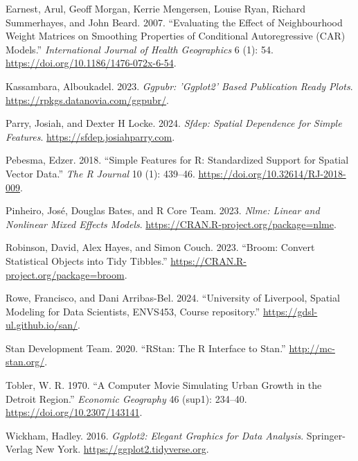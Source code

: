 \begin{CSLReferences}{1}{0}
\leavevmode{}%
Earnest, Arul, Geoff Morgan, Kerrie Mengersen, Louise Ryan, Richard Summerhayes, and John Beard. 2007. {``Evaluating the Effect of Neighbourhood Weight Matrices on Smoothing Properties of Conditional Autoregressive (CAR) Models.''} \emph{International Journal of Health Geographics} 6 (1): 54. \url{https://doi.org/10.1186/1476-072x-6-54}.

\leavevmode{}%
Kassambara, Alboukadel. 2023. \emph{Ggpubr: 'Ggplot2' Based Publication Ready Plots}. \url{https://rpkgs.datanovia.com/ggpubr/}.

\leavevmode{}%
Parry, Josiah, and Dexter H Locke. 2024. \emph{Sfdep: Spatial Dependence for Simple Features}. \url{https://sfdep.josiahparry.com}.

\leavevmode{}%
Pebesma, Edzer. 2018. {``{Simple Features for R: Standardized Support for Spatial Vector Data}.''} \emph{{The R Journal}} 10 (1): 439--46. \url{https://doi.org/10.32614/RJ-2018-009}.

\leavevmode{}%
Pinheiro, José, Douglas Bates, and R Core Team. 2023. \emph{Nlme: Linear and Nonlinear Mixed Effects Models}. \url{https://CRAN.R-project.org/package=nlme}.

\leavevmode{}%
Robinson, David, Alex Hayes, and Simon Couch. 2023. {``Broom: Convert Statistical Objects into Tidy Tibbles.''} \url{https://CRAN.R-project.org/package=broom}.

\leavevmode{}%
Rowe, Francisco, and Dani Arribas-Bel. 2024. {``{University of Liverpool, Spatial Modeling for Data Scientists, ENVS453, Course repository}.''} \url{https://gdsl-ul.github.io/san/}.

\leavevmode{}%
Stan Development Team. 2020. {``{RStan}: The {R} Interface to {Stan}.''} \url{http://mc-stan.org/}.

\leavevmode{}%
Tobler, W. R. 1970. {``A Computer Movie Simulating Urban Growth in the Detroit Region.''} \emph{Economic Geography} 46 (sup1): 234--40. \url{https://doi.org/10.2307/143141}.

\leavevmode{}%
Wickham, Hadley. 2016. \emph{Ggplot2: Elegant Graphics for Data Analysis}. Springer-Verlag New York. \url{https://ggplot2.tidyverse.org}.


\end{CSLReferences}
